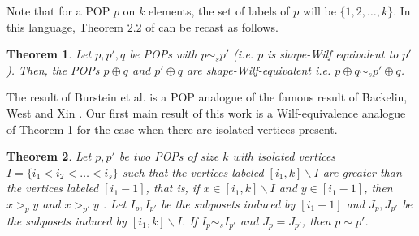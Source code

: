 \documentclass[12pt, english, a4paper]{article}
\newcommand{\blue}[1]{\textcolor{blue}{#1}}
\theoremstyle{plain}
\newtheorem{theorem}{Theorem}
\theoremstyle{definition}
\theoremstyle{remark}
\begin{document}
Note that for a POP $p$ on $k$ elements, the set of labels of $p$ will be $\{1,2,\dots, k\}$.
In this language, Theorem $2.2$ of \cite{burstein-shape-wilf} can be recast as follows.

\begin{theorem}{\cite[Theorem 2.2]{burstein-shape-wilf}}\label{thm: ordinal sum}
    Let $p, p', q$ be POPs with $p \sim_s p'$ (i.e. $p$ is shape-Wilf equivalent
    to $p'$). Then, %
    the POPs $p \oplus q$ and $p' \oplus q$ are shape-Wilf-equivalent i.e. $p\oplus q \sim_s p' \oplus q$. 
\end{theorem}
The result of Burstein et al. is a POP analogue of the famous result of Backelin, West and Xin \cite[Proposition 2.3]{bwx-main}.
 Our first main result of this work is a Wilf-equivalence analogue of Theorem \ref{thm: ordinal sum} for the case when there are isolated vertices present.

\begin{theorem}
\label{thm: main1-shape}
    Let $p,p'$ be two POPs of size $k$ with isolated vertices $I=\{i_1< i_2<\dots< i_s\}$  such that the vertices labeled $[i_1,k]\backslash I$ are greater than the vertices labeled $[i_1-1]$, that is, if $x \in [i_1,k]\backslash I$ and $y \in [i_1-1]$, then $x>_p y$ and $x >_{p'}y$ . Let $I_p,I_{p'}$ be the subposets induced by $[i_1-1]$ and $J_p,J_{p'}$ be the subposets induced by $[i_1,k]\backslash I$. If $I_p\sim_s I_{p'}$ and $J_p=J_{p'}$, then $p\sim p'$.
\end{theorem}
\end{document}
